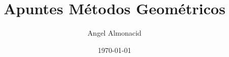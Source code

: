 
\usepackage[most]{tcolorbox}
\usepackage{aleph-comandos}
\usepackage{enumitem}
\usepackage{amssymb}
\usepackage{titling}
\usepackage[a4paper,margin=1in]{geometry}
\usepackage{multicol}
\title{Apuntes Métodos Geométricos}
\author{Angel Almonacid}
\date{\today}



\newcommand{\caja}[3]{%
  \begin{tcolorbox}[colback=#1!5!white,colframe=#1!25!black,title=#2]
    #3
  \end{tcolorbox}%
z}




